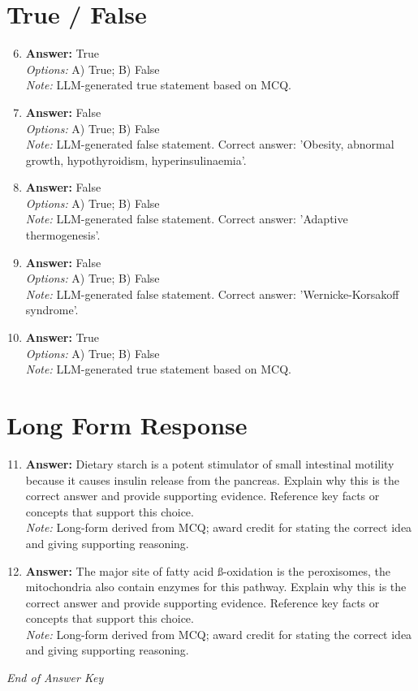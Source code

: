 \documentclass[12pt]{article}
\begin{document}
\section*{True / False}
\begin{enumerate}[label=\arabic*.]
\setcounter{enumi}{5}
\item \textbf{Answer:} True
\\ \textit{Options:} A) True; B) False
\\ \textit{Note:} LLM-generated true statement based on MCQ.
\item \textbf{Answer:} False
\\ \textit{Options:} A) True; B) False
\\ \textit{Note:} LLM-generated false statement. Correct answer: 'Obesity, abnormal growth, hypothyroidism, hyperinsulinaemia'.
\item \textbf{Answer:} False
\\ \textit{Options:} A) True; B) False
\\ \textit{Note:} LLM-generated false statement. Correct answer: 'Adaptive thermogenesis'.
\item \textbf{Answer:} False
\\ \textit{Options:} A) True; B) False
\\ \textit{Note:} LLM-generated false statement. Correct answer: 'Wernicke-Korsakoff syndrome'.
\item \textbf{Answer:} True
\\ \textit{Options:} A) True; B) False
\\ \textit{Note:} LLM-generated true statement based on MCQ.
\end{enumerate}

\section*{Long Form Response}
\begin{enumerate}[label=\arabic*.]
\setcounter{enumi}{10}
\item \textbf{Answer:} Dietary starch is a potent stimulator of small intestinal motility because it causes insulin release from the pancreas. Explain why this is the correct answer and provide supporting evidence. Reference key facts or concepts that support this choice.
\\ \textit{Note:} Long-form derived from MCQ; award credit for stating the correct idea and giving supporting reasoning.
\item \textbf{Answer:} The major site of fatty acid ß-oxidation is the peroxisomes, the mitochondria also contain enzymes for this pathway. Explain why this is the correct answer and provide supporting evidence. Reference key facts or concepts that support this choice.
\\ \textit{Note:} Long-form derived from MCQ; award credit for stating the correct idea and giving supporting reasoning.
\end{enumerate}

\vfill
\noindent\textit{End of Answer Key}
\end{document}
